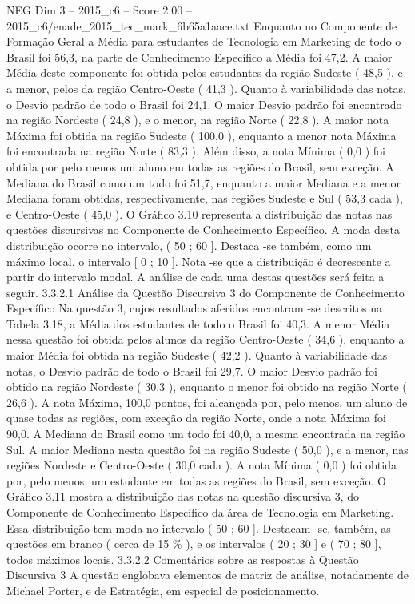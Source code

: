 \begin{textsample}{NEG Dim 3 – 2015\_c6 – Score 2.00 – 2015\_c6/enade\_2015\_tec\_mark\_6b65a1aace.txt}
Enquanto no Componente de Formação Geral a Média para estudantes de Tecnologia em Marketing de todo o Brasil foi 56,3, na parte de Conhecimento Específico a Média foi 47,2.
A maior Média deste componente foi obtida pelos estudantes da região Sudeste ( 48,5 ), e a menor, pelos da região Centro-Oeste ( 41,3 ).
Quanto à variabilidade das notas, o Desvio padrão de todo o Brasil foi 24,1.
O maior Desvio padrão foi encontrado na região Nordeste ( 24,8 ), e o menor, na região Norte ( 22,8 ).
A maior nota Máxima foi obtida na região Sudeste ( 100,0 ), enquanto a menor nota Máxima foi encontrada na região Norte ( 83,3 ).
Além disso, a nota Mínima ( 0,0 ) foi obtida por pelo menos um aluno em todas as regiões do Brasil, sem exceção.
A Mediana do Brasil como um todo foi 51,7, enquanto a maior Mediana e a menor Mediana foram obtidas, respectivamente, nas regiões Sudeste e Sul ( 53,3 cada ), e Centro-Oeste ( 45,0 ).
O Gráfico 3.10 representa a distribuição das notas nas questões discursivas no Componente de Conhecimento Específico.
A moda desta distribuição ocorre no intervalo, ( 50 ; 60 ].
Destaca -se também, como um máximo local, o intervalo [ 0 ; 10 ].
Nota -se que a distribuição é decrescente a partir do intervalo modal.
A análise de cada uma destas questões será feita a seguir. 3.3.2.1 Análise da Questão Discursiva 3 do Componente de Conhecimento Específico Na questão 3, cujos resultados aferidos encontram -se descritos na Tabela 3.18, a Média dos estudantes de todo o Brasil foi 40,3.
A menor Média nessa questão foi obtida pelos alunos da região Centro-Oeste ( 34,6 ), enquanto a maior Média foi obtida na região Sudeste ( 42,2 ).
Quanto à variabilidade das notas, o Desvio padrão de todo o Brasil foi 29,7.
O maior Desvio padrão foi obtido na região Nordeste ( 30,3 ), enquanto o menor foi obtido na região Norte ( 26,6 ).
A nota Máxima, 100,0 pontos, foi alcançada por, pelo menos, um aluno de quase todas as regiões, com exceção da região Norte, onde a nota Máxima foi 90,0.
A Mediana do Brasil como um todo foi 40,0, a mesma encontrada na região Sul.
A maior Mediana nesta questão foi na região Sudeste ( 50,0 ), e a menor, nas regiões Nordeste e Centro-Oeste ( 30,0 cada ).
A nota Mínima ( 0,0 ) foi obtida por, pelo menos, um estudante em todas as regiões do Brasil, sem exceção.
O Gráfico 3.11 mostra a distribuição das notas na questão discursiva 3, do Componente de Conhecimento Específico da área de Tecnologia em Marketing.
Essa distribuição tem moda no intervalo ( 50 ; 60 ].
Destacam -se, também, as questões em branco ( cerca de 15 \% ), e os intervalos ( 20 ; 30 ] e ( 70 ; 80 ], todos máximos locais. 3.3.2.2 Comentários sobre as respostas à Questão Discursiva 3 A questão englobava elementos de matriz de análise, notadamente de Michael Porter, e de Estratégia, em especial de posicionamento.

\end{textsample}
